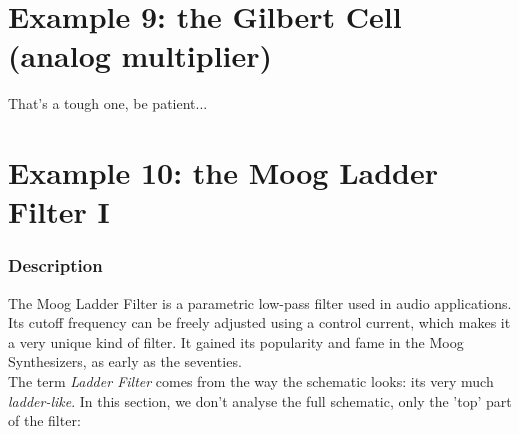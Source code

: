 \documentclass[10pt]{article}
\begin{document}
\section*{Example 9: the Gilbert Cell (analog multiplier)}
That's a tough one, be patient...


\section*{Example 10: the Moog Ladder Filter I}

\subsubsection*{Description}
The Moog Ladder Filter is a parametric low-pass filter used in audio applications.
Its cutoff frequency can be freely adjusted using a control current, which makes it a very unique kind of filter.
It gained its popularity and fame in the Moog Synthesizers, as early as the seventies.\\

The term \textit{Ladder Filter} comes from the way the schematic looks: its very much \textit{ladder-like}. 
In this section, we don't analyse the full schematic, only the 'top' part of the filter:
\end{document}
